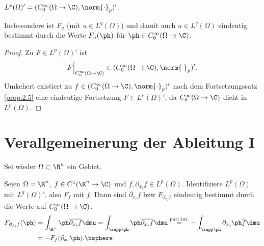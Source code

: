 \begin{prop}
\label{prop:7.23}
$L^p(\Omega)' = (C_0^\infty(\Omega\to\C),\norm{\cdot}_p)'$.\fishhere
\end{prop}

Insbesondere ist $F_u$ (mit $u\in L^q(\Omega)$) und damit auch $u\in
L^q(\Omega)$ eindeutig bestimmt durch die Werte $F_u(\ph)$ für $\ph\in
C_0^\infty(\Omega\to\C)$.

\begin{proof}
Zu $F\in L^p(\Omega)'$ ist
\begin{align*}
F\Big|_{C_0^\infty(\Omega\to\C)} \in 
(C_0^\infty(\Omega\to\C),\norm{\cdot}_p)'.
\end{align*}
Umkehert existiert zu $f\in (C_0^\infty(\Omega\to\C),\norm{\cdot}_p)'$ nach dem
Fortsetzungssatz \ref{prop:2.5} eine eindeutige Fortsetzung $F\in
L^p(\Omega)'$, da $C_0^\infty(\Omega\to\C)$ dicht in $L^p(\Omega)$.\qedhere 
\end{proof}

\section{Verallgemeinerung der Ableitung I}

Sei wieder $\Omega\subset\R^n$ ein Gebiet.

\begin{bsp}
\label{bsp:7.24}
Seien $\Omega=\R^n$, $f\in C^1(\R^n\to \C)$ und $f,\partial_{x_i} f \in
L^p(\Omega)$. Identifiziere $L^p(\Omega)$ mit $L^q(\Omega)'$, also $F_f$ mit
$f$. Dann sind $\partial_{x_i} f$ bzw $F_{\partial_{x_i} f}$ eindeutig bestimmt
durch die Werte auf $C_0^\infty(\Omega\to\C)$.
\begin{align*}
F_{\partial_{x_i}f}(\ph) &=
\int_{\R^n} \ph\overline{\partial_{x_i}f}\dmu = 
\int_{\supp \ph} \ph\overline{\partial_{x_i}f}\dmu
\overset{\text{part.int.}}{=}
-\int_{\supp \ph} \partial_{x_i}\ph\overline{f}\dmu\\
&= -F_{f}(\partial_{x_i}\ph).\bsphere
\end{align*}
\end{bsp}

